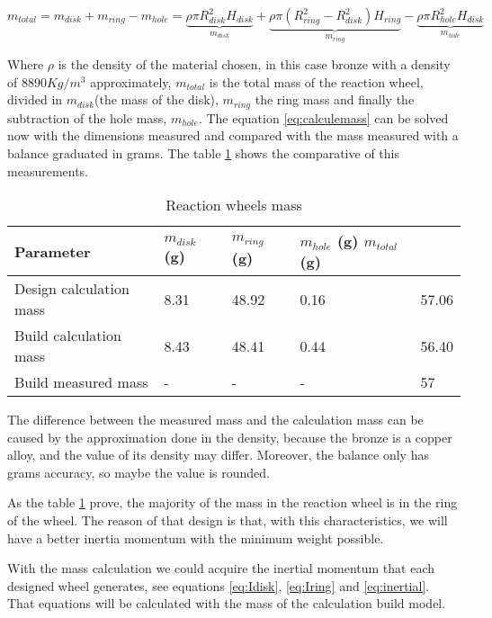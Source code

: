 \begin{equation}
m_{total} =  m_{disk}+ m_{ring}- m_{hole}= \underbrace{\rho\pi R^2_{disk} H_{disk}}_{m_{disk}} + \underbrace{\rho\pi (R^2_{ring}-R^2_{disk}) H_{ring}}_{m_{ring}} - \underbrace{\rho\pi R^2_{hole} H_{disk}}_{m_{hole}} 
\label{eq:calculemass}
\end{equation}

Where $\rho$ is the density of the material chosen, in this case bronze with a density of $8890 Kg/m^3$ approximately, $m_{total}$ is the total mass of the reaction wheel, divided in $m_{disk}$(the mass of the disk), $m_{ring}$ the ring mass and finally the subtraction of the hole mass, $m_{hole}$. The equation \ref{eq:calculemass} can be solved now with the dimensions measured and compared with the mass measured with a balance graduated in grams. The table \ref{tab:masswheel} shows the comparative of this measurements.  

\begin{table}[H]
\centering
\begin{tabular}{|l|l|l|l|l|}
\hline\hline
\textbf{Parameter}		 & $m_{disk}$ (g) & $m_{ring}$ (g) & $m_{hole}$ (g) \textbf{$m_{total}$ (g)}	\\ \hline
Design calculation mass	& 8.31 & 48.92 & 0.16 & 57.06 \\ \hline
Build calculation mass   & 8.43 & 48.41 & 0.44 & 56.40        \\ \hline
Build measured mass    & - & - & - & 57       \\ \hline\hline
\end{tabular}
\caption{Reaction wheels mass}\label{tab:masswheel}
\end{table}

The difference between the measured mass and the calculation mass can be caused by the approximation done in the density, because the bronze is a copper alloy, and the value of its density may differ. Moreover, the balance only has grams accuracy, so maybe the value is 
rounded.

As the table \ref{tab:masswheel} prove, the majority of the mass in the reaction wheel is in the ring of the wheel. The reason of that design is that, with this characteristics, we will have a better inertia momentum with the minimum weight possible.

With the mass calculation we could acquire the inertial momentum that each designed wheel generates, see equations \ref{eq:Idisk}, \ref{eq:Iring} and \ref{eq:inertial}. That equations will be calculated with the mass of the calculation build model.

